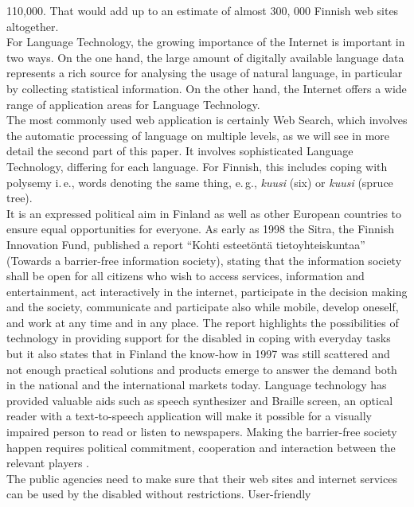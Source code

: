 \begin{multicols}{2}
110,000. That would add up to an estimate of almost 300, 000 Finnish
web sites altogether.\\
For Language Technology, the growing importance of the Internet is
important in two ways. On the one hand, the large amount of digitally
available language data represents a rich source for analysing the
usage of natural language, in particular by collecting statistical
information. On the other hand, the Internet offers a wide range of
application areas for Language Technology.\\
The most commonly used web application is certainly Web Search, which
involves the automatic processing of language on multiple levels, as
we will see in more detail the second part of this paper. It involves
sophisticated Language Technology, differing for each language. For
Finnish, this includes coping with polysemy
i.\,e., words denoting the same thing, e.\,g.,
\textit{\foreignlanguage{finnish}{\textit{kuusi}}} (six) or
\textit{\foreignlanguage{finnish}{\textit{kuusi}}} (spruce tree).\\
It is an expressed political aim in Finland as well as other European
countries to ensure equal opportunities for everyone. As early as 1998
the Sitra, the Finnish Innovation Fund, published a report
“\foreignlanguage{finnish}{Kohti
esteetöntä tietoyhteiskuntaa}” (Towards a barrier-free information
society), stating that the information society
shall be open for all citizens who wish to access services, information
and entertainment, act interactively in the internet,
participate in the decision making and the society, communicate and
participate also while mobile, develop oneself, and work at any time
and in any place. The report highlights the possibilities of technology in
providing support for the disabled in coping with everyday tasks but
it also states that in Finland the know-how in 1997 was still
scattered and not enough practical solutions and products emerge to
answer the demand both in the national and the international
markets today. Language technology has provided valuable aids such as speech
synthesizer and Braille screen, an optical reader with a
text-to-speech application will make it possible for a visually
impaired person to read or listen to newspapers. Making the
barrier-free society happen requires political commitment, cooperation
and interaction between the relevant players \cite{Sitra1998}.\\
The public agencies need to make sure that their web sites and internet
services can be used by the disabled without restrictions. User-friendly

\end{multicols}
